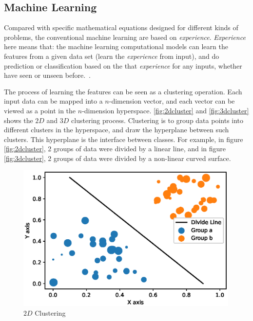 \begin{spacing}{1.5}
\subsection{Machine Learning}

Compared with specific mathematical equations designed for different kinds of problems, the conventional machine learning are based on \textit{experience}. \textit{Experience} here means that: the machine learning computational models can learn the features from a given data set (learn the \textit{experience} from input), and do prediction or classification based on the that \textit{experience} for any inputs, whether have seen or unseen before.~\cite{mohri2018foundations}.

The process of learning the features can be seen as a clustering operation. Each input data can be mapped into a $n$-dimension vector, and each vector can be viewed as a point in the $n$-dimension hyperspace. \autoref{fig:2dcluster} and \autoref{fig:3dcluster} shows the $2D$ and $3D$ clustering process. Clustering is to group data points into different clusters in the hyperspace, and draw the hyperplane between such clusters. This hyperplane is the interface between classes. For example, in figure \autoref{fig:2dcluster}, 2 groups of data were divided by a linear line, and in figure \autoref{fig:3dcluster}, 2 groups of data were divided by a non-linear curved surface.

\begin{figure}[ht]
\centering
\includegraphics[width=0.99\textwidth, fbox]{Chapter2/2dcluster.eps}
\caption{$2D$ Clustering}
\label{fig:2dcluster} 
\end{figure}


\end{spacing}
